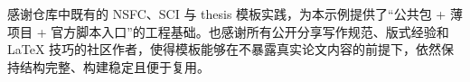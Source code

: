 感谢仓库中既有的 NSFC、SCI 与 thesis 模板实践，为本示例提供了“公共包 + 薄项目 + 官方脚本入口”的工程基础。也感谢所有公开分享写作规范、版式经验和 LaTeX 技巧的社区作者，使得模板能够在不暴露真实论文内容的前提下，依然保持结构完整、构建稳定且便于复用。

